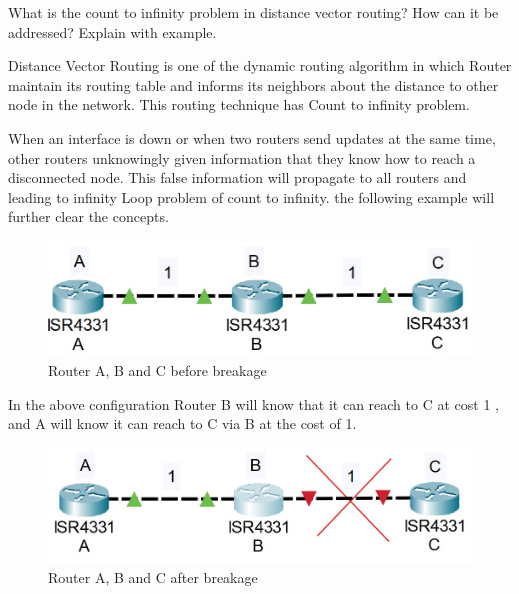 \documentclass[a4paper,11pt]{article}
\begin{document}
\begin{Q}
    {
        What is the count to infinity problem in distance vector routing? How can it be addressed?
        Explain with example.
    }
\end{Q}
\begin{A}
    {
        Distance Vector Routing is one of the dynamic routing algorithm in which Router maintain its routing table and informs its neighbors about  the distance to other node in the network. This routing technique has Count to infinity problem.

        When  an interface is down or  when two routers send updates at the same time, other routers unknowingly given information that they know how to reach a disconnected node. This false information will propagate to all routers and leading to infinity Loop problem of count to infinity. the following example will further clear the concepts.

        \begin{figure}[H]
            \centering
            \includegraphics[scale=0.75,cframe=blue 0.5pt 3pt]{./CTI1.jpg}
            \caption{ Router A, B and C before breakage }
        \end{figure}

        In the above configuration Router B will know that it can reach to C at cost 1 , and A will know it can reach to C via B at the cost of 1.


        \begin{figure}[H]
            \centering
            \includegraphics[scale=0.75,cframe=blue 0.5pt 3pt]{./CTI2.jpg}
            \caption{ Router A, B and C after breakage }
        \end{figure}

}
\end{A}
\end{document}
